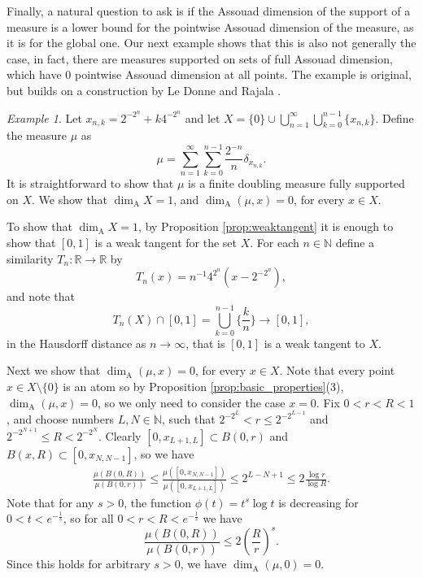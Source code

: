 \documentclass{PRM}
\newcommand{\field}[1]{\mathbb{#1}}
\newcommand{\N}{\field{N}}
\newcommand{\R}{\field{R}}
\theoremstyle{plain}
\theoremstyle{definition}
\theoremstyle{remark}
\newtheorem{example}[thm]{Example}
\begin{document}
Finally, a natural question to ask is if the Assouad dimension of the support of a measure is a lower bound for the pointwise Assouad dimension of the measure, as it is for the global one. Our next example shows that this is also not generally the case, in fact, there are measures supported on sets of full Assouad dimension, which have $0$ pointwise Assouad dimension at all points. The example is original, but builds on a construction by Le Donne and Rajala \cite[Example 2.20]{LR}.

\begin{example}
Let $x_{n,k}=2^{-2^n}+k4^{-2^n}$ and let $X=\{0\}\cup\bigcup_{n=1}^{\infty}\bigcup_{k=0}^{n-1}\{x_{n,k}\}$. Define the measure $\mu$ as 
\begin{equation*}
    \mu=\sum_{n=1}^{\infty}\sum_{k=0}^{n-1}\frac{2^{-n}}{n}\delta_{x_{n,k}}.
\end{equation*}
It is straightforward to show that $\mu$ is a finite doubling measure fully supported on $X$. We show that $\dim_{\mathrm{A}}X=1$, and $\dim_{\mathrm{A}}(\mu,x)=0$, for every $x\in X$.

To show that $\dim_{\mathrm{A}}X= 1$, by Proposition \ref{prop:weaktangent} it is enough to show that $[0,1]$ is a weak tangent for the set $X$. For each $n\in\N$ define a similarity $T_n:\R\to \R$ by
\begin{equation*}
    T_n(x)=n^{-1}4^{2^n}(x-2^{-2^n}),
\end{equation*}
and note that
\begin{equation*}
    T_n(X)\cap[0,1]=\bigcup_{k=0}^{n-1}\Big\{\frac{k}{n}\Big\}\to[0,1],
\end{equation*}
in the Hausdorff distance as $n\to\infty$, that is $[0,1]$ is a weak tangent to $X$.

Next we show that $\dim_{\mathrm{A}}(\mu,x)=0$, for every $x\in X$. Note that every point $x\in X\setminus\{0\}$ is an atom so by Proposition \ref{prop:basic_properties}(3), $\dim_{\mathrm{A}}(\mu,x)=0$, so we only need to consider the case $x=0$. Fix $0<r<R<1$, and choose numbers $L,N\in\N$, such that $2^{-2^L}< r \leq 2^{-2^{L-1}}$ and $2^{-2^{N+1}}\leq R < 2^{-2^{N}}$. Clearly $[0,x_{L+1,L}]\subset B(0,r)$ and $B(x,R)\subset [0,x_{N,N-1}]$, so we have
\begin{align*}
    \frac{\mu(B(0,R))}{\mu(B(0,r))}\leq\frac{\mu([0,x_{N,N-1}])}{\mu([0,x_{L+1,L}])}\leq 2^{L-N+1}\leq 2\frac{\log r}{\log R}.
\end{align*}
Note that for any $s>0$, the function $\phi(t)=t^s\log t$ is decreasing for  $0<t<e^{-\frac{1}{s}}$, so for all $0<r<R<e^{-\frac{1}{s}}$ we have
\begin{equation*}
    \frac{\mu(B(0,R))}{\mu(B(0,r))}\leq 2\left(\frac{R}{r}\right)^s.
\end{equation*}
Since this holds for arbitrary $s>0$, we have $\dim_{\mathrm{A}}(\mu,0)=0$.
\end{example}
\end{document}
